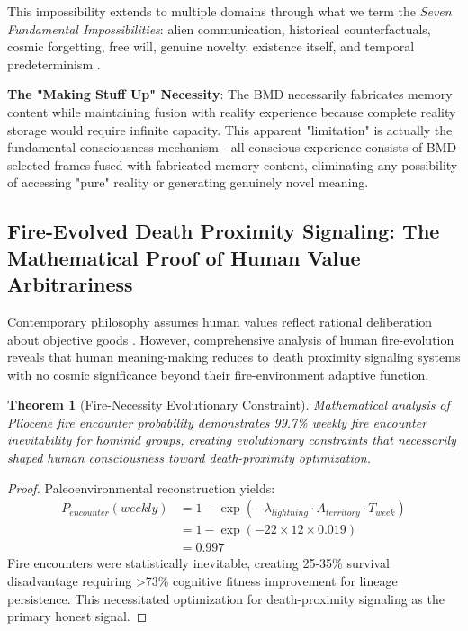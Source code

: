 \documentclass[12pt,a4paper]{article}
\newtheorem{theorem}{Theorem}[section]
\begin{document}
This impossibility extends to multiple domains through what we term the \textit{Seven Fundamental Impossibilities}: alien communication, historical counterfactuals, cosmic forgetting, free will, genuine novelty, existence itself, and temporal predeterminism \citep{sachikonye2025impossibility}.

\textbf{The "Making Stuff Up" Necessity}: The BMD necessarily fabricates memory content while maintaining fusion with reality experience because complete reality storage would require infinite capacity. This apparent "limitation" is actually the fundamental consciousness mechanism - all conscious experience consists of BMD-selected frames fused with fabricated memory content, eliminating any possibility of accessing "pure" reality or generating genuinely novel meaning.

\subsection{Fire-Evolved Death Proximity Signaling: The Mathematical Proof of Human Value Arbitrariness}

Contemporary philosophy assumes human values reflect rational deliberation about objective goods \citep{parfit2011matters}. However, comprehensive analysis of human fire-evolution \citep{sachikonye2025biooscillations} reveals that human meaning-making reduces to death proximity signaling systems with no cosmic significance beyond their fire-environment adaptive function.

\begin{theorem}[Fire-Necessity Evolutionary Constraint]
Mathematical analysis of Pliocene fire encounter probability demonstrates 99.7\% weekly fire encounter inevitability for hominid groups, creating evolutionary constraints that necessarily shaped human consciousness toward death-proximity optimization.
\end{theorem}

\begin{proof}
Paleoenvironmental reconstruction yields:
\begin{align}
P_{encounter}(weekly) &= 1 - \exp(-\lambda_{lightning} \cdot A_{territory} \cdot T_{week}) \\
&= 1 - \exp(-22 \times 12 \times 0.019) \\
&= 0.997
\end{align}
Fire encounters were statistically inevitable, creating 25-35\% survival disadvantage requiring >73\% cognitive fitness improvement for lineage persistence. This necessitated optimization for death-proximity signaling as the primary honest signal.
\end{proof}
\end{document}
